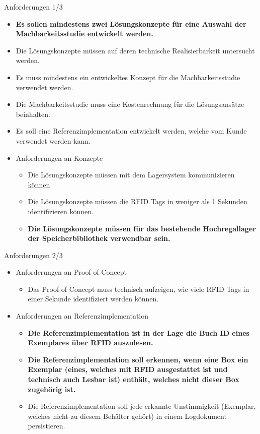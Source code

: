 \documentclass{beamer}
\begin{document}
\begin{frame}{Anforderungen 1/3}
 \begin{itemize}
    \item \textbf{Es sollen mindestens zwei Lösungskonzepte für eine Auswahl der Machbarkeitsstudie entwickelt werden.}
    \item Die Lösungskonzepte müssen auf deren technische Realisierbarkeit untersucht werden.
    \item Es muss mindestens ein entwickeltes Konzept für die Machbarkeitsstudie verwendet werden.
    \item Die Machbarkeitsstudie muss eine Kostenrechnung für die Lösungsansätze beinhalten.
    \item Es soll eine Referenzimplementation entwickelt werden, welche vom Kunde verwendet werden kann.
    
    \item Anforderungen an Konzepte
    \begin{itemize}
        \item Die Lösungskonzepte müssen mit dem Lagersystem kommunizieren können
        \item Die Lösungskonzepte müssen die RFID Tags in weniger als 1 Sekunden identifizieren können.
        \item \textbf{Die Lösungskonzepte müssen für das bestehende Hochregallager der Speicherbibliothek verwendbar sein.}
    \end{itemize}
\end{itemize}
\end{frame}
\begin{frame}{Anforderungen 2/3}
\begin{itemize}
    \item Anforderungen an Proof of Concept
    \begin{itemize}
        \item Das Proof of Concept muss technisch aufzeigen, wie viele RFID Tags in einer Sekunde identifiziert werden können.
    \end{itemize}
    \item Anforderungen an Referenzimplementation
    \begin{itemize}
        \item \textbf{Die Referenzimplementation ist in der Lage die Buch ID eines Exemplares über RFID auszulesen.}
        \item \textbf{Die Referenzimplementation soll erkennen, wenn eine Box ein Exemplar (eines, welches mit RFID ausgestattet ist und technisch auch Lesbar ist) enthält, welches nicht dieser Box zugehörig ist.}
        \item Die Referenzimplementation soll jede erkannte Unstimmigkeit (Exemplar, welches nicht zu diesem Behälter gehört) in einem Logdokument persistieren.
    \end{itemize}
\end{itemize}
\end{frame}
\end{document}
